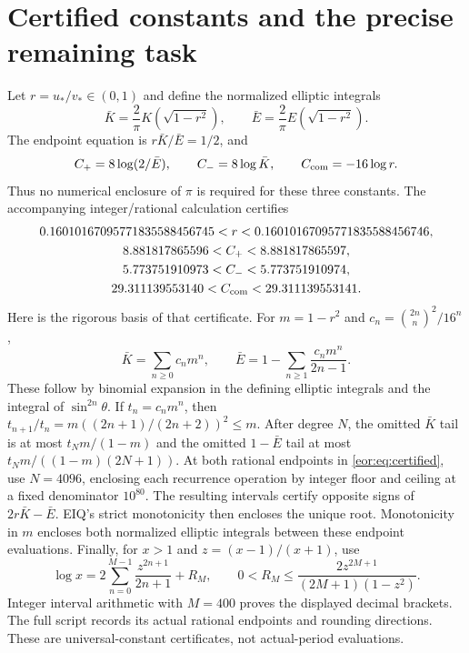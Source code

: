 \documentclass[11pt,a4paper]{article}
\begin{document}
\section{Certified constants and the precise remaining task}
Let $r=u_*/v_*\in(0,1)$ and define the normalized elliptic integrals
\[
 \bar K=\frac{2}{\pi}K(\sqrt{1-r^2}),\qquad
 \bar E=\frac{2}{\pi}E(\sqrt{1-r^2}).
\]
The endpoint equation is $r\bar K/\bar E=1/2$, and
\begin{equation}
 C_+=8\log(2/\bar E),\qquad C_-=8\log\bar K,
 \qquad C_{\rm com}=-16\log r.
 \label{eor:eq:ellipticconstants}
\end{equation}
Thus no numerical enclosure of $\pi$ is required for these three constants.
The accompanying integer/rational calculation certifies
\begin{equation}
\begin{gathered}
 0.16010167095771835588456745<r<
 0.16010167095771835588456746,\\
 8.881817865596<C_+<8.881817865597,\\
 5.773751910973<C_-<5.773751910974,\\
 29.311139553140<C_{\rm com}<29.311139553141.
\end{gathered}\label{eor:eq:certified}
\end{equation}
Here is the rigorous basis of that certificate. For $m=1-r^2$ and
$c_n=\binom{2n}{n}^2/16^n$,
\[
 \bar K=\sum_{n\ge0}c_nm^n,\qquad
 \bar E=1-\sum_{n\ge1}\frac{c_nm^n}{2n-1}.
\]
These follow by binomial expansion in the defining elliptic integrals and the
integral of $\sin^{2n}\theta$. If $t_n=c_nm^n$, then
$t_{n+1}/t_n=m((2n+1)/(2n+2))^2\le m$.
After degree $N$, the omitted $\bar K$ tail is at most $t_Nm/(1-m)$ and the
omitted $1-\bar E$ tail at most $t_Nm/((1-m)(2N+1))$.
At both rational endpoints in \eqref{eor:eq:certified}, use $N=4096$, enclosing each
recurrence operation by integer floor and ceiling at a fixed denominator
$10^{80}$. The resulting intervals certify opposite signs of
$2r\bar K-\bar E$. EIQ's strict monotonicity then encloses the unique root.
Monotonicity in $m$ encloses both normalized elliptic integrals between these
endpoint evaluations. Finally, for $x>1$ and $z=(x-1)/(x+1)$, use
\[
 \log x=2\sum_{n=0}^{M-1}\frac{z^{2n+1}}{2n+1}+R_M,
 \qquad0<R_M\le\frac{2z^{2M+1}}{(2M+1)(1-z^2)}.
\]
Integer interval arithmetic with $M=400$ proves the displayed decimal brackets.
The full script records its actual rational endpoints and rounding directions.
These are universal-constant certificates, not actual-period evaluations.
\end{document}
